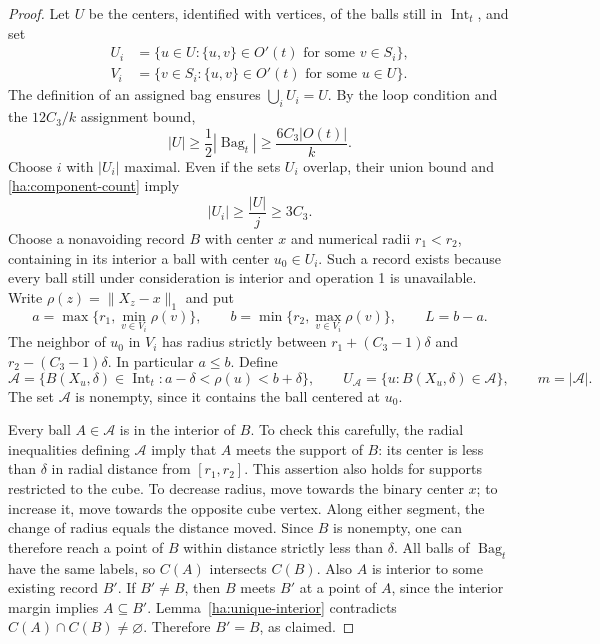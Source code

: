 \begin{proof}
Let $U$ be the centers, identified with vertices, of the balls still
in $\operatorname{Int}_t$, and set
\[
 \begin{split}
 U_i&=\{u\in U:\{u,v\}\in O'(t)\text{ for some }v\in S_i\},\\
 V_i&=\{v\in S_i:\{u,v\}\in O'(t)\text{ for some }u\in U\}.
 \end{split}
\]
The definition of an assigned bag ensures $\bigcup_iU_i=U$.
By the loop condition and the $12C_3/k$ assignment bound,
\[
 |U|\geq\frac12|\operatorname{Bag}_t|
       \geq\frac{6C_3|O(t)|}{k}.
\]
Choose $i$ with $|U_i|$ maximal.  Even if the sets $U_i$ overlap,
their union bound and \eqref{ha:component-count} imply
\begin{equation}
 |U_i|\geq\frac{|U|}{j}\geq3C_3.
 \label{ha:many-neighbors}
\end{equation}
Choose a nonavoiding record $B$ with center $x$ and numerical radii
$r_1<r_2$, containing in its interior a ball with center $u_0\in U_i$.
Such a record exists because
every ball still under consideration is interior and operation 1 is
unavailable.  Write $\rho(z)=\|X_z-x\|_1$ and put
\begin{equation}
 a=\max\{r_1,\min_{v\in V_i}\rho(v)\},\qquad
 b=\min\{r_2,\max_{v\in V_i}\rho(v)\},\qquad L=b-a.
 \label{ha:radial-endpoints}
\end{equation}
The neighbor of $u_0$ in $V_i$ has radius strictly between
$r_1+(C_3-1)\delta$ and $r_2-(C_3-1)\delta$.  In particular $a\leq b$.
Define
\[
 \mathcal A=
 \{B(X_u,\delta)\in\operatorname{Int}_t:
                a-\delta<\rho(u)<b+\delta\},
 \qquad U_{\mathcal A}=\{u:B(X_u,\delta)\in\mathcal A\},
 \qquad m=|\mathcal A|.
\]
The set $\mathcal A$ is nonempty, since it contains the ball centered
at $u_0$.

Every ball $A\in\mathcal A$ is in the interior of $B$.  To check this
carefully, the radial inequalities defining $\mathcal A$ imply that
$A$ meets the support of $B$: its center is less than $\delta$ in
radial distance from $[r_1,r_2]$.  This assertion also holds for supports
restricted to the cube.  To decrease radius, move towards the binary
center $x$; to increase it, move towards the opposite cube vertex.
Along either segment, the change of radius equals the distance moved.
Since $B$ is nonempty, one can therefore reach a point of $B$ within
distance strictly less than $\delta$.  All balls of $\operatorname{Bag}_t$
have the same labels, so $C(A)$ intersects $C(B)$.  Also $A$ is
interior to some existing record $B'$.  If $B'\ne B$, then $B$ meets
$B'$ at a point of $A$, since the interior margin implies $A\subseteq
B'$.  Lemma~\ref{ha:unique-interior} contradicts
$C(A)\cap C(B)\ne\varnothing$.  Therefore $B'=B$, as claimed.


\end{proof}
